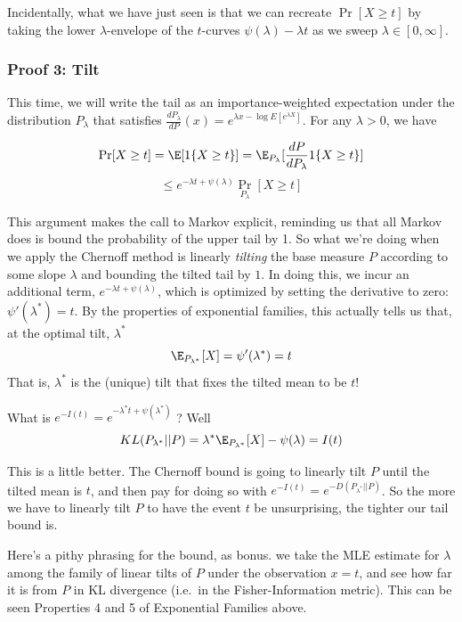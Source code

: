 \documentclass[
  letterpaper,
  DIV=11,
  numbers=noendperiod]{scrartcl}
\begin{document}
Incidentally, what we have just seen is that we can recreate
\(\Pr[X \geq t]\) by taking the lower \(\lambda\)-envelope of the
\(t\)-curves \(\psi(\lambda) - \lambda t\) as we sweep
\(\lambda \in [0, \infty]\).

\subsubsection{Proof 3: Tilt}\label{proof-3-tilt}

This time, we will write the tail as an importance-weighted expectation
under the distribution \(P_\lambda\) that satisfies
\(\frac{dP_\lambda}{dP}(x) = e^{\lambda x - \log E[e^{\lambda X}]}\).
For any \(\lambda > 0\), we have

\[\Pr[X \geq t] = \E[1\{X \geq t\}] = \E_{P_\lambda}[\frac{dP}{dP_\lambda}1\{X \geq t\}]\]
\[ \leq e^{- \lambda t + \psi(\lambda)}\Pr_{P_\lambda}[X \geq t]\]

This argument makes the call to Markov explicit, reminding us that all
Markov does is bound the probability of the upper tail by 1. So what
we're doing when we apply the Chernoff method is linearly \emph{tilting}
the base measure \(P\) according to some slope \(\lambda\) and bounding
the tilted tail by \(1\). In doing this, we incur an additional term,
\(e^{-\lambda t + \psi(\lambda)}\), which is optimized by setting the
derivative to zero: \(\psi'(\lambda^*) = t\). By the properties of
exponential families, this actually tells us that, at the optimal tilt,
\(\lambda^*\) \[\E_{P_{\lambda^*}}[X] = \psi'(\lambda^*) = t\] That is,
\(\lambda^*\) is the (unique) tilt that fixes the tilted mean to be
\(t\)!

What is \(e^{-I(t)} = e^{-\lambda^* t + \psi(\lambda^*)}\) ? Well
\[KL(P_{\lambda^*} || P) = \lambda^* \E_{P_{\lambda^*}}[X] - \psi(\lambda) = I(t)\]

This is a little better. The Chernoff bound is going to linearly tilt
\(P\) until the tilted mean is \(t\), and then pay for doing so with
\(e^{-I(t)} = e^{-D(P_{\lambda^*} || P)}\). So the more we have to
linearly tilt \(P\) to have the event \(t\) be unsurprising, the tighter
our tail bound is.

Here's a pithy phrasing for the bound, as bonus. we take the MLE
estimate for \(\lambda\) among the family of linear tilts of \(P\) under
the observation \(x = t\), and see how far it is from \(P\) in KL
divergence (i.e.~in the Fisher-Information metric). This can be seen
Properties 4 and 5 of Exponential Families above.
\end{document}
